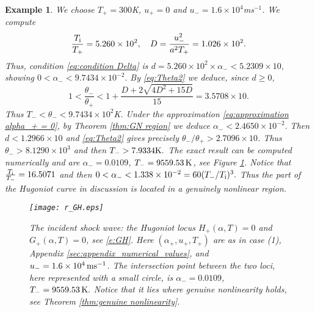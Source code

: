 \documentclass[10pt,a4paper]{article}
\newtheorem{nb}{Remark}[section]
\newtheorem{example}{Example}[section]
\numberwithin{equation}{section}
\newcommand{\Ti}{T_{\rm i}}
\begin{document}
\begin{example}\label{ex:hydrogen_gas} We choose $T_{+} = 300 ${\rm K}, $u_+=0$ and $u_- = 1.6 \times 10^4${\rm ms}${}^{-1}$. We compute
$$
  \frac{\Ti}{T_{+}} =  5.260 \times 10^2, \quad
  D = \frac{u_-^2}{a^2T_{+}} = 1.026 \times 10^2. %
$$
Thus, condition \eqref{eq:condition Delta} is
$
      d = 5.260 \times 10^2 \times \alpha_- < 5.2309 \times 10, %
$
showing $0 < \alpha_- < 9.7434 \times 10^{-2}.$ 
By \eqref{eq:Theta2} we deduce, since $d\ge0$,
\begin{equation}\label{e:thetaless}
1 < \frac{\theta_-}{\theta_+} < 1+ \frac{D+2\sqrt{4D^2+15D}}{15} = 3.5708 \times 10.
\end{equation}
Thus 
$
T_- < \theta_- < 9.7434\times 10^2
${\rm K}.
Under the approximation \eqref{eq:approximation alpha_+ = 0}, by Theorem \ref{thm:GN region} we deduce
$\alpha_- < 
2.4650\times 10^{-2}. %
$
Then $d < 1.2966 \times 10$  %
and \eqref{eq:Theta2} gives precisely $\theta_-/\theta_+ > 2.7096\times 10$. Thus $\theta_- > 8.1290\times10^3$ and then $T_->
7.9334{\rm K}.
$ 
The exact result can be computed numerically and are $\alpha_- = 0.0109$, $T_{-} = 9559.53\,{\rm K}$, see Figure \ref{fig:Hugoniot+G(a,T)_16000}.  Notice that $\frac{\Ti}{T_-} = 16.5071$ and then
$
   0 < \alpha_- < 1.338 \times 10^{-2}=60(T_-/T_{\rm i})^3.
$
Thus the part of the Hugoniot curve in discussion is located in a genuinely nonlinear region.

\begin{figure}[hbt]
\centering
\texttt{[image: r\_GH.eps]}
\caption{The incident shock wave: the Hugoniot locus $H_+(\alpha,T)=0$ and $G_+(\alpha, T) = 0$, see \eqref{e:GH}. Here $(\alpha_+,u_+,T_+)$ are as in case (1), Appendix \ref{sec:appendix_numerical_values}, and $u_- = 1.6\times10^4\,{\rm m s}{}^{-1}$. The intersection point between the two loci, here represented with a small circle, is $\alpha_- = 0.0109$, $T_{-} = 9559.53\,{\rm K}.$ Notice that it lies where genuine nonlinearity holds, see Theorem \ref{thm:genuine nonlinearity}.}\label{fig:Hugoniot+G(a,T)_16000}
\end{figure}

\end{example}
\end{document}

